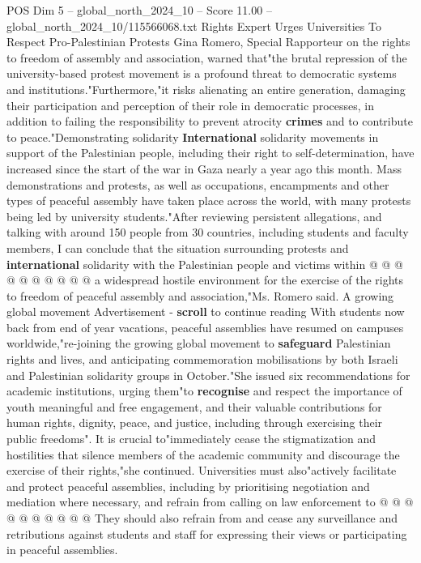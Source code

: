 \begin{textsample}{POS Dim 5 – global\_north\_2024\_10 – Score 11.00 – global\_north\_2024\_10/115566068.txt}  \label{ex:f5_pos_410}
Rights Expert Urges Universities To Respect Pro-Palestinian Protests Gina Romero, Special Rapporteur on the rights to freedom of assembly and association, warned that"the brutal repression of the university-based protest movement is a profound threat to democratic systems and institutions."Furthermore,"it risks alienating an entire generation, damaging their participation and perception of their role in democratic processes, in addition to failing the responsibility to prevent atrocity \textbf{crimes} and to contribute to peace."Demonstrating solidarity \textbf{International} solidarity movements in support of the Palestinian people, including their right to self-determination, have increased since the start of the war in Gaza nearly a year ago this month.
Mass demonstrations and protests, as well as occupations, encampments and other types of peaceful assembly have taken place across the world, with many protests being led by university students."After reviewing persistent allegations, and talking with around 150 people from 30 countries, including students and faculty members, I can conclude that the situation surrounding protests and \textbf{international} solidarity with the Palestinian people and victims within @ @ @ @ @ @ @ @ @ @ a widespread hostile environment for the exercise of the rights to freedom of peaceful assembly and association,"Ms.
Romero said.
A growing global movement Advertisement - \textbf{scroll} to continue reading With students now back from end of year vacations, peaceful assemblies have resumed on campuses worldwide,"re-joining the growing global movement to \textbf{safeguard} Palestinian rights and lives, and anticipating commemoration mobilisations by both Israeli and Palestinian solidarity groups in October."She issued six recommendations for academic institutions, urging them"to \textbf{recognise} and respect the importance of youth meaningful and free engagement, and their valuable contributions for human rights, dignity, peace, and justice, including through exercising their public freedoms".
It is crucial to"immediately cease the stigmatization and hostilities that silence members of the academic community and discourage the exercise of their rights,"she continued.
Universities must also"actively facilitate and protect peaceful assemblies, including by prioritising negotiation and mediation where necessary, and refrain from calling on law enforcement to @ @ @ @ @ @ @ @ @ @ They should also refrain from and cease any surveillance and retributions against students and staff for expressing their views or participating in peaceful assemblies.

\end{textsample}
